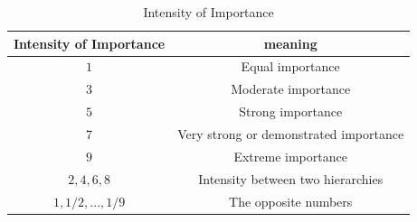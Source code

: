 \documentclass{mcmthesis}
\begin{document}
\begin{table}[!ht]
\centering
  \begin{tabular}{cc}
  \hline
   Intensity of Importance & meaning  \\
  \hline
  $1$ & Equal importance \\
  $3$ & Moderate importance \\
  $5$ & Strong importance \\
  $7$ & Very strong or demonstrated importance \\
  $9$ & Extreme importance \\
  $2,4,6,8$ & Intensity between two hierarchies \\
  $1,1/2,...,1/9$ & The opposite numbers\\
  \hline
  \end{tabular}
  \caption{Intensity of Importance}
\end{table}
\end{document}
